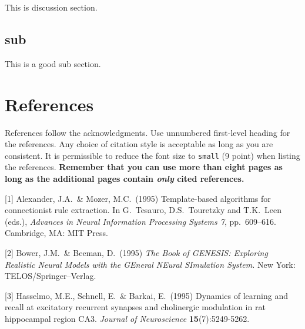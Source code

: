 \documentclass{article}
\begin{document}
This is discussion section.

\subsection{sub}

This is a good sub section.

\section*{References}

References follow the acknowledgments. Use unnumbered first-level heading for
the references. Any choice of citation style is acceptable as long as you are
consistent. It is permissible to reduce the font size to \verb+small+ (9 point)
when listing the references. {\bf Remember that you can use more than eight
  pages as long as the additional pages contain \emph{only} cited references.}
\medskip

\small

[1] Alexander, J.A.\ \& Mozer, M.C.\ (1995) Template-based algorithms for
connectionist rule extraction. In G.\ Tesauro, D.S.\ Touretzky and T.K.\ Leen
(eds.), {\it Advances in Neural Information Processing Systems 7},
pp.\ 609--616. Cambridge, MA: MIT Press.

[2] Bower, J.M.\ \& Beeman, D.\ (1995) {\it The Book of GENESIS: Exploring
  Realistic Neural Models with the GEneral NEural SImulation System.}  New York:
TELOS/Springer--Verlag.

[3] Hasselmo, M.E., Schnell, E.\ \& Barkai, E.\ (1995) Dynamics of learning and
recall at excitatory recurrent synapses and cholinergic modulation in rat
hippocampal region CA3. {\it Journal of Neuroscience} {\bf 15}(7):5249-5262.
\end{document}
